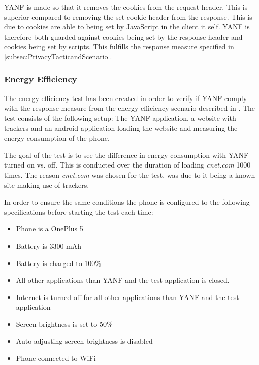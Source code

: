\documentclass[main.tex]{subfiles}
\begin{document}
YANF is made so that it removes the cookies from the request header. This is superior compared to removing the set-cookie header from the response. This is due to cookies are able to being set by JavaScript in the client it self. YANF is therefore both guarded against cookies being set by the response header and cookies being set by scripts. This fulfills the response measure specified in \autoref{subsec:PrivacyTacticandScenario}.




\subsubsection{Energy Efficiency}
\label{sec:EnergyTest}
The energy efficiency test has been created in order to verify if YANF comply with the response measure from the energy efficiency scenario described in . The test consists of the following setup: The YANF application, a website with trackers and an android application loading the website and measuring the energy consumption of the phone. 

The goal of the test is to see the difference in energy consumption with YANF turned on vs. off. This is conducted over the duration of loading \textit{cnet.com} 1000 times. The reason \textit{cnet.com} was chosen for the test, was due to it being a known site making use of trackers. 

In order to ensure the same conditions the phone is configured to the following specifications before starting the test each time:
\begin{itemize}
    \item Phone is a OnePlus 5
    \item Battery is 3300 mAh
    \item Battery is charged to 100\%
    \item All other applications than YANF and the test application is closed. 
    \item Internet is turned off for all other applications than YANF and the test application
    \item Screen brightness is set to 50\%
    \item Auto adjusting screen brightness is disabled
    \item Phone connected to WiFi
\end{itemize}
\end{document}
